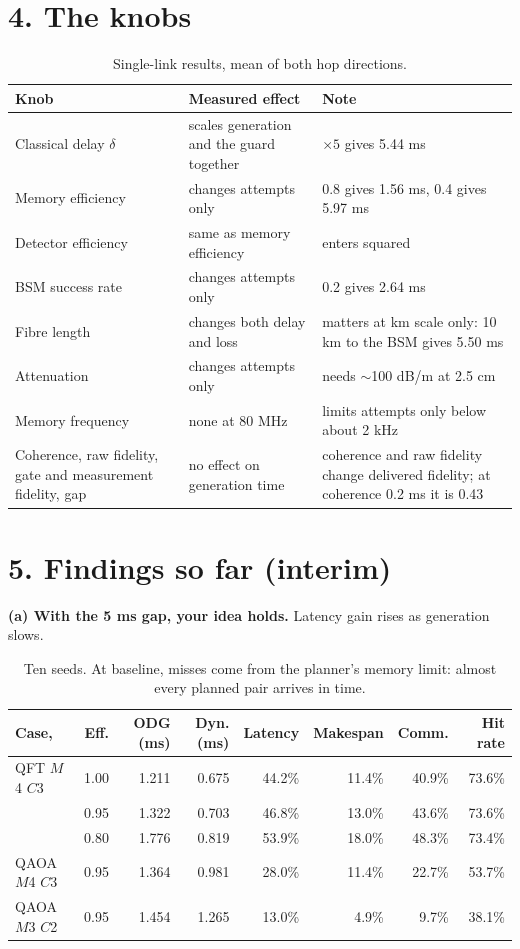 \documentclass[10.5pt,a4paper]{article}
\newcommand{\code}[1]{\texttt{\detokenize{#1}}}
\begin{document}
\section*{4. The knobs}
\begin{table}[H]\centering\small
\begin{tabular}{@{}p{4.0cm}p{4.9cm}p{7.2cm}@{}}\toprule
Knob & Measured effect & Note \\\midrule
Classical delay $\delta$ & scales generation and the guard together & $\times5$ gives 5.44 ms \\
Memory efficiency & changes attempts only & 0.8 gives 1.56 ms, 0.4 gives 5.97 ms \\
Detector efficiency & same as memory efficiency & enters squared \\
BSM success rate & changes attempts only & 0.2 gives 2.64 ms \\
Fibre length & changes both delay and loss & matters at km scale only: 10 km to the BSM gives 5.50 ms \\
Attenuation & changes attempts only & needs $\sim$100 dB/m at 2.5 cm \\
Memory frequency & none at 80 MHz & limits attempts only below about 2 kHz \\
Coherence, raw fidelity, gate and measurement fidelity, gap & no effect on generation time & coherence and raw fidelity change delivered fidelity; at coherence 0.2 ms it is 0.43 \\\bottomrule
\end{tabular}\caption{Single-link results, mean of both hop directions.}\end{table}

\section*{5. Findings so far (interim)}
\textbf{(a) With the 5 ms gap, your idea holds.} Latency gain rises as generation slows.
\begin{table}[H]\centering\small
\begin{tabular}{@{}lrrrrrrr@{}}\toprule
Case, \code{history} & Eff. & ODG (ms) & Dyn. (ms) & Latency & Makespan & Comm. & Hit rate \\\midrule
QFT $M$4 $C$3 & 1.00 & 1.211 & 0.675 & 44.2\% & 11.4\% & 40.9\% & 73.6\% \\
 & 0.95 & 1.322 & 0.703 & 46.8\% & 13.0\% & 43.6\% & 73.6\% \\
 & 0.80 & 1.776 & 0.819 & 53.9\% & 18.0\% & 48.3\% & 73.4\% \\
QAOA $M$4 $C$3 & 0.95 & 1.364 & 0.981 & 28.0\% & 11.4\% & 22.7\% & 53.7\% \\
QAOA $M$3 $C$2 & 0.95 & 1.454 & 1.265 & 13.0\% & 4.9\% & 9.7\% & 38.1\% \\\bottomrule
\end{tabular}\caption{Ten seeds. At baseline, misses come from the planner's memory limit: almost every planned pair arrives in time.}\end{table}
\end{document}

